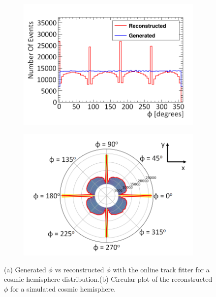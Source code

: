\begin{figure}[!h]
\centering
\begin{subfigure}{.5\textwidth}
  \centering
  \includegraphics[width=\linewidth]{Chapter6/Figs/Raster/hemispherePhi_linHistMedText.png}
  \captionsetup{width=.9\linewidth}
  \caption{} 
  \label{subFig:phiGenVsRecoHem}
\end{subfigure}%
\begin{subfigure}{.5\textwidth}
  \centering
\includegraphics[width=\linewidth]{Chapter6/Figs/Raster/hemispherePhi_cirHistMedText.png}
  \captionsetup{width=.9\linewidth}
  \caption{}
  \label{subFig:cirPhiGenVsRecoHem}
\end{subfigure}
\caption{(a) Generated $\phi$ vs reconstructed $\phi$ with the online track fitter for a cosmic hemisphere distribution.(b) Circular plot of the reconstructed $\phi$ for a simulated cosmic hemisphere.}
\label{fig:linCirPhiGenVsRecoHem}
\end{figure}

